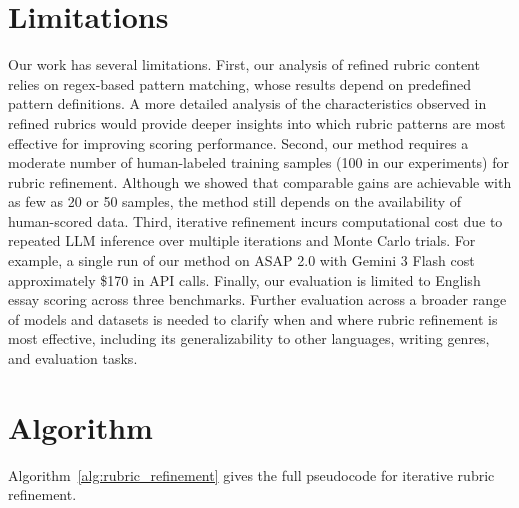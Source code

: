 \documentclass[11pt]{article}
\begin{document}
\section*{Limitations}
Our work has several limitations. First, our analysis of refined rubric content relies on regex-based pattern matching, whose results depend on predefined pattern definitions. A more detailed analysis of the characteristics observed in refined rubrics would provide deeper insights into which rubric patterns are most effective for improving scoring performance. Second, our method requires a moderate number of human-labeled training samples (100 in our experiments) for rubric refinement. Although we showed that comparable gains are achievable with as few as 20 or 50 samples, the method still depends on the availability of human-scored data. Third, iterative refinement incurs computational cost due to repeated LLM inference over multiple iterations and Monte Carlo trials. For example, a single run of our method on ASAP 2.0 with Gemini 3 Flash cost approximately \$170 in API calls. Finally, our evaluation is limited to English essay scoring across three benchmarks. Further evaluation across a broader range of models and datasets is needed to clarify when and where rubric refinement is most effective, including its generalizability to other languages, writing genres, and evaluation tasks.



\appendix

\section{Algorithm}
\label{sec:appendix}

Algorithm~\ref{alg:rubric_refinement} gives the full pseudocode for iterative rubric refinement.
\end{document}
